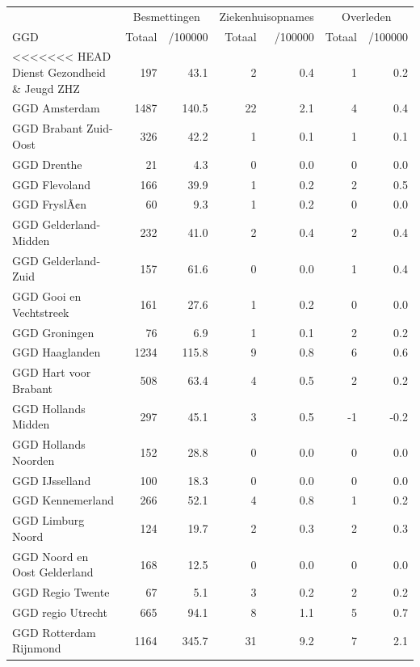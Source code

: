 \documentclass[
  english,
  man,floatsintext]{apa6}
\begin{document}
\begin{table}[H]
\centering\begingroup\fontsize{10}{12}\selectfont

\begin{threeparttable}
\begin{tabular}{lrrrrrr}
\toprule
\multicolumn{1}{c}{ } & \multicolumn{2}{c}{Besmettingen} & \multicolumn{2}{c}{Ziekenhuisopnames} & \multicolumn{2}{c}{Overleden} \\
\cmidrule(l{3pt}r{3pt}){2-3} \cmidrule(l{3pt}r{3pt}){4-5} \cmidrule(l{3pt}r{3pt}){6-7}
GGD & Totaal & /100000 & Totaal & /100000 & Totaal & /100000\\
\midrule
<<<<<<< HEAD
Dienst Gezondheid \& Jeugd ZHZ & 197 & 43.1 & 2 & 0.4 & 1 & 0.2\\
GGD Amsterdam & 1487 & 140.5 & 22 & 2.1 & 4 & 0.4\\
GGD Brabant Zuid-Oost & 326 & 42.2 & 1 & 0.1 & 1 & 0.1\\
GGD Drenthe & 21 & 4.3 & 0 & 0.0 & 0 & 0.0\\
GGD Flevoland & 166 & 39.9 & 1 & 0.2 & 2 & 0.5\\
GGD FryslÃ¢n & 60 & 9.3 & 1 & 0.2 & 0 & 0.0\\
GGD Gelderland-Midden & 232 & 41.0 & 2 & 0.4 & 2 & 0.4\\
GGD Gelderland-Zuid & 157 & 61.6 & 0 & 0.0 & 1 & 0.4\\
GGD Gooi en Vechtstreek & 161 & 27.6 & 1 & 0.2 & 0 & 0.0\\
GGD Groningen & 76 & 6.9 & 1 & 0.1 & 2 & 0.2\\
GGD Haaglanden & 1234 & 115.8 & 9 & 0.8 & 6 & 0.6\\
GGD Hart voor Brabant & 508 & 63.4 & 4 & 0.5 & 2 & 0.2\\
GGD Hollands Midden & 297 & 45.1 & 3 & 0.5 & -1 & -0.2\\
GGD Hollands Noorden & 152 & 28.8 & 0 & 0.0 & 0 & 0.0\\
GGD IJsselland & 100 & 18.3 & 0 & 0.0 & 0 & 0.0\\
GGD Kennemerland & 266 & 52.1 & 4 & 0.8 & 1 & 0.2\\
GGD Limburg Noord & 124 & 19.7 & 2 & 0.3 & 2 & 0.3\\
GGD Noord en Oost Gelderland & 168 & 12.5 & 0 & 0.0 & 0 & 0.0\\
GGD Regio Twente & 67 & 5.1 & 3 & 0.2 & 2 & 0.2\\
GGD regio Utrecht & 665 & 94.1 & 8 & 1.1 & 5 & 0.7\\
GGD Rotterdam Rijnmond & 1164 & 345.7 & 31 & 9.2 & 7 & 2.1\\

\end{tabular}
\end{threeparttable}
\end{table}
\end{document}
